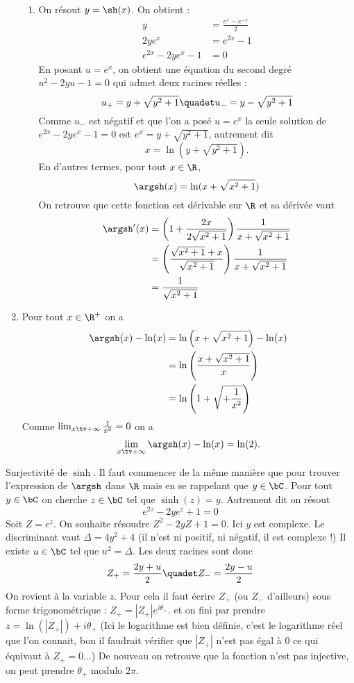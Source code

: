 \begin{correction}
\begin{enumerate}
\begin{enumerate}
\item On résout $y = \sh(x)$. On obtient : 
\begin{align*}
y &= \frac{e^{x}-e^{-x}}{2}\\
2ye^{x} &=e^{2x}-1\\
e^{2x}-2ye^{x}-1&=0
\end{align*}
En posant $u=e^{x}$, on obtient une équation du second degré  
$u^2 -2yu -1=0$ qui admet deux racines réelles : 
$$u_+ = y + \sqrt{y^2 +1}  \quadet  u_- = y - \sqrt{y^2 +1}$$
Comme $u_-$ est négatif et que l'on a posé $ u=e^x$ la seule solution de $
e^{2x}-2ye^{x}-1=0$ est $e^x =  y + \sqrt{y^2 +1}  $, autrement dit 
$$x= \ln( y +\sqrt{y^2+1}).$$
En d'autres termes, pour tout $x\in \R$,  $$\argsh(x) = \ln( x +\sqrt{x^2+1})$$
On retrouve que cette fonction est dérivable sur $\R$ et sa dérivée vaut 
\begin{align*}
\argsh'(x)  &= \left(1 + \frac{2x}{2\sqrt{x^2+1}} \right)\frac{1}{ x+\sqrt{x^2+1} }\\
&= \left( \frac{\sqrt{x^2+1}+x}{\sqrt{x^2+1}} \right)\frac{1}{ x+\sqrt{x^2+1} }\\
				&= \frac{1}{\sqrt{x^2+1}}
\end{align*}









\end{enumerate}
\item Pour tout $x\in \R^+$ on a 
\begin{align*}
\argsh(x)- \ln(x) &= \ln\left(x+\sqrt{x^2+1}\right) -\ln(x) \\
							&= \ln\left(\frac{x+\sqrt{x^2+1}}{x}\right)  \\
							&= \ln\left(1+\sqrt{+\frac{1}{x^2}}\right)  
\end{align*}
Comme $\lim_{x\tv+\infty} \frac{1}{x^2}=0$ on a 
$$\lim_{x\tv+\infty} \argsh(x)- \ln(x) =\ln(2).$$



\end{enumerate}


Surjectivité de $\sinh$. Il faut commencer de la même manière que pour trouver l'expression de $\argsh$ dans $\R$ mais en se rappelant que $y\in \bC$. Pour tout $y\in \bC$ on cherche $z\in \bC$ tel que $\sinh(z) =y$. Autrement dit on résout 
$$e^{2z}-2ye^{z} +1=0$$
Soit $Z=e^{z}$. On souhaite résoudre $Z^2 -2yZ+1=0$. 
Ici $y$ est complexe.  Le discriminant vaut $\Delta=4y^2+4$ (il n'est ni positif, ni négatif, il est complexe !) Il existe $u \in \bC$ tel que $u^2 =\Delta$. 
Les deux racines sont donc 
$$Z_+ = \frac{2y +u}{2} \quadet Z_- = \frac{2y-u}{2}$$
On revient à la variable $z$.  Pour cela il faut écrire 
$Z_+ $ (ou $Z_-$ d'ailleurs) sous forme trigonométrique : 
$Z_+ = |Z_+|e^{i\theta_+}$. 
et on fini par prendre $z = \ln(|Z_+|) +i\theta_+$
(Ici le logarithme est bien définie, c'est le logarithme réel que l'on connait, bon il faudrait vérifier que $|Z_+|$ n'est pas égal à 0 ce qui équivaut à $Z_+ =0$...) 
De nouveau on retrouve que la fonction n'est pas injective, on peut prendre $\theta_+ $ modulo $2\pi$. 
\end{correction}
